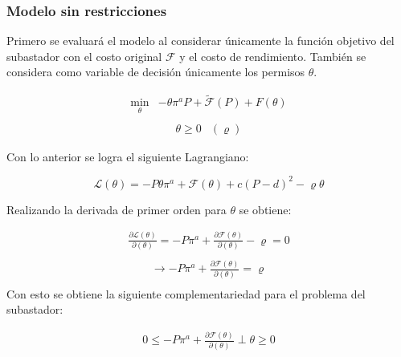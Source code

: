 \subsubsection{Modelo sin restricciones}

Primero se evaluará el modelo al considerar únicamente la función objetivo del subastador con el costo original $\mathcal{F}$ y el costo de rendimiento. También se considera como variable de decisión únicamente los permisos $\theta$.  

\begin{equation}
\begin{array}{rrclcl}
    \displaystyle \min_{\theta} & -\theta \pi^aP + \tilde{\mathcal{F}}(P)+F(\theta)  \label{fo:perfornorest}\\
\end{array}
\end{equation}
\begin{equation}
\begin{array}{cl}
    \theta \geq 0 & (\varrho)
\end{array}
\end{equation}

Con lo anterior se logra el siguiente Lagrangiano:

$$\mathcal{L}(\theta)=-P\theta\pi^a+\mathcal{F}(\theta)+c(P-d)^2 - \varrho\theta $$

Realizando la derivada de primer orden para $\theta$ se obtiene:

\begin{equation}
\begin{array}{rrclcl}
    \frac{\partial\mathcal{L}(\theta)}{\partial (\theta)}=-P\pi^a+\frac{\partial\mathcal{F}(\theta)}{\partial(\theta)}-\varrho=0 \label{lag1}\\
\end{array}
\end{equation}
\begin{equation}
\begin{array}{rrclcl}
    \rightarrow -P\pi^a+\frac{\partial\mathcal{F}(\theta)}{\partial(\theta)}=\varrho \label{lag11}\\
\end{array}
\end{equation}
Con esto se obtiene la siguiente complementariedad para el problema del subastador:

\begin{equation}
\begin{array}{rrclcl}
    0\leq -P\pi^a+\frac{\partial\mathcal{F}(\theta)}{\partial(\theta)}\perp \theta \geq 0 \label{compllag1}\\
\end{array}
\end{equation}

